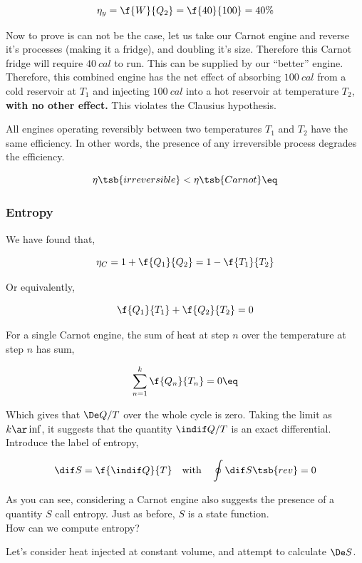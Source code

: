 \documentclass{article}
\begin{document}
\[ \eta_y = \f{W}{Q_2} = \f{40}{100} = 40\% \]

Now to prove is can not be the case, let us take our Carnot engine and reverse it's processes (making it a fridge), and doubling it's size. Therefore this Carnot fridge will require $\SI{40}{cal}$ to run. This can be supplied by our ``better'' engine. Therefore, this combined engine has the net effect of absorbing $\SI{100}{cal}$ from a cold reservoir at $T_1$ and injecting $\SI{100}{cal}$ into a hot reservoir at temperature $T_2$, \textbf{with no other effect.} This violates the Clausius hypothesis.


All engines operating reversibly between two temperatures $T_1$ and $T_2$ have the same efficiency. In other words, the presence of any irreversible process degrades the efficiency.

\[ \eta\tsb{irreversible} < \eta\tsb{Carnot} \eq \label{eq:irreversiblecarnot}\]

\subsubsection{Entropy}

We have found that,

\[ \eta_C = 1 + \f{Q_1}{Q_2} = 1 - \f{T_1}{T_2} \]

Or equivalently,

\[ \f{Q_1}{T_1} + \f{Q_2}{T_2} = 0 \]

For a single Carnot engine, the sum of heat at step $n$ over the temperature at step $n$ has sum,

\[  \sum_{n=1}^{k} \f{Q_n}{T_n} = 0 \eq \label{eq:revcarnot}\]

Which gives that $\De Q / T$ over the whole cycle is zero. Taking the limit as $k \ar \inf$, it suggests that the quantity $\indif Q / T$ is an exact differential. Introduce the label of entropy,

\[ \dif S = \f{\indif Q}{T} \quad \text{with} \quad \oint \dif S\tsb{rev} = 0  \]

As you can see, considering a Carnot engine also suggests the presence of a quantity $S$ call entropy. Just as before, $S$ is a state function. \\

How can we compute entropy? \\


Let's consider heat injected at constant volume, and attempt to calculate $\De S$.
\end{document}
